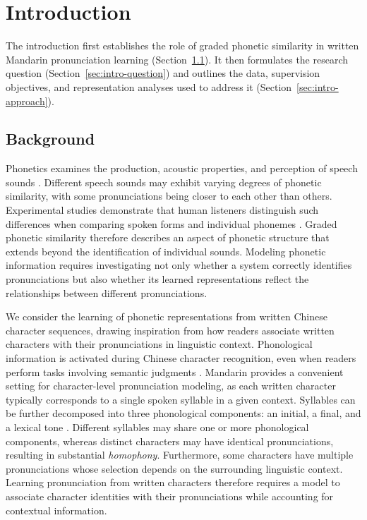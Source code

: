 \section{Introduction}
\label{sec:intro}

The introduction first establishes the role of graded phonetic similarity in
written Mandarin pronunciation learning (Section~\ref{sec:intro-background}).
It then formulates the research question (Section~\ref{sec:intro-question})
and outlines the data, supervision objectives, and representation analyses
used to address it (Section~\ref{sec:intro-approach}).

\subsection{Background}
\label{sec:intro-background}

Phonetics examines the production, acoustic properties, and perception of speech
sounds \cite{ref_phonetic_sciences}. Different speech sounds may exhibit varying
degrees of phonetic similarity, with some pronunciations being closer to each
other than others. Experimental studies demonstrate that human listeners
distinguish such differences when comparing spoken forms and individual phonemes
\cite{ref_word_similarity,ref_phoneme_similarity}. Graded phonetic similarity
therefore describes an aspect of phonetic structure that extends beyond the
identification of individual sounds. Modeling phonetic information requires
investigating not only whether a system correctly identifies pronunciations but
also whether its learned representations reflect the relationships between
different pronunciations.

We consider the learning of phonetic representations from written Chinese
character sequences, drawing inspiration from how readers associate written
characters with their pronunciations in linguistic context. Phonological
information is activated during Chinese character recognition, even when readers
perform tasks involving semantic judgments
\cite{ref_early_phonology,ref_chinese_reading}. Mandarin provides a convenient
setting for character-level pronunciation modeling, as each written character
typically corresponds to a single spoken syllable in a given context. Syllables
can be further decomposed into three phonological components: an initial, a
final, and a lexical tone \cite{ref_mandarin_phonology}. Different syllables may
share one or more phonological components, whereas distinct characters may have
identical pronunciations, resulting in substantial \textit{homophony}.
Furthermore, some characters have multiple pronunciations whose selection
depends on the surrounding linguistic context. Learning pronunciation from
written characters therefore requires a model to associate character identities
with their pronunciations while accounting for contextual information.


